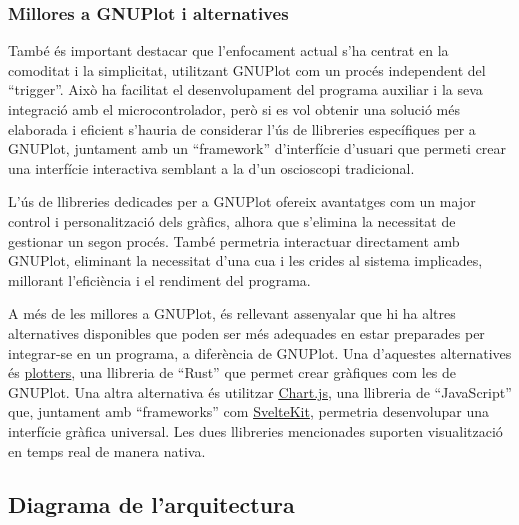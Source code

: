 \documentclass{tfgitic}[2023/06/30]
\begin{document}
\newpage

\subsubsection{Millores a GNUPlot i alternatives}

També és important destacar que l'enfocament actual s'ha centrat en la
comoditat i la simplicitat, utilitzant GNUPlot com un procés
independent del ``trigger''. Això ha facilitat el desenvolupament del
programa auxiliar i la seva integració amb el microcontrolador, però
si es vol obtenir una solució més elaborada i eficient s'hauria de
considerar l'ús de llibreries específiques per a GNUPlot, juntament
amb un ``framework'' d'interfície d'usuari que permeti crear una
interfície interactiva semblant a la d'un osci\lgem oscopi
tradicional.

L'ús de llibreries dedicades per a GNUPlot ofereix avantatges com un
major control i personalització dels gràfics, alhora que s'elimina la
necessitat de gestionar un segon procés. També permetria interactuar
directament amb GNUPlot, eliminant la necessitat d'una cua i les
crides al sistema implicades, millorant l'eficiència i el rendiment
del programa.

A més de les millores a GNUPlot, és rellevant assenyalar que hi ha
altres alternatives disponibles que poden ser més adequades en estar
preparades per integrar-se en un programa, a diferència de
GNUPlot. Una d'aquestes alternatives és
\href{https://docs.rs/plotters/latest/plotters}{\underline{plotters}},
una llibreria de ``Rust'' que permet crear gràfiques com les de
GNUPlot. Una altra alternativa és utilitzar
\href{https://www.chartjs.org/}{\underline{Chart.js}}, una llibreria
de ``JavaScript'' que, juntament amb ``frameworks'' com
\href{https://kit.svelte.dev/}{\underline{SvelteKit}}, permetria
desenvolupar una interfície gràfica universal. Les dues llibreries
mencionades suporten visualització en temps real de manera nativa.

\subsection{Diagrama de l'arquitectura}
\end{document}
